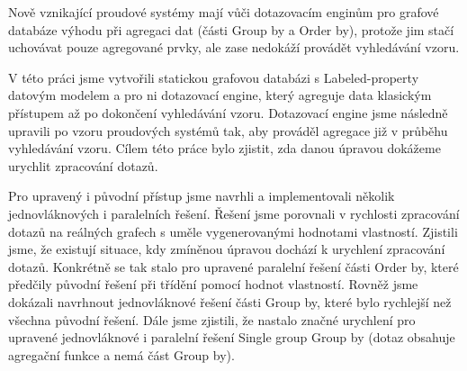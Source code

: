 \documentclass[12pt]{report}
\begin{document}
Nově vznikající proudové systémy mají vůči dotazovacím enginům pro grafové databáze výhodu při agregaci dat (části Group by a Order by), protože jim stačí uchovávat pouze agregované prvky, ale zase nedokáží provádět vyhledávání vzoru.

V této práci jsme vytvořili statickou grafovou databázi s Labeled-property datovým modelem a pro ni dotazovací engine, který agreguje data klasickým přístupem až po dokončení vyhledávání vzoru.
Dotazovací engine jsme následně upravili po vzoru proudových systémů tak, aby prováděl agregace již v průběhu vyhledávání vzoru.
Cílem této práce bylo zjistit, zda danou úpravou dokážeme urychlit zpracování dotazů.

Pro upravený i původní přístup jsme navrhli a implementovali několik jednovláknových i paralelních řešení.
Řešení jsme porovnali v rychlosti zpracování dotazů na reálných grafech s uměle vygenerovanými hodnotami vlastností.
Zjistili jsme, že existují situace, kdy zmíněnou úpravou dochází k urychlení zpracování dotazů.
Konkrétně se tak stalo pro upravené paralelní řešení části Order by, které předčily původní řešení při třídění pomocí hodnot vlastností.
Rovněž jsme dokázali navrhnout jednovláknové řešení části Group by, které bylo rychlejší než všechna původní řešení. 
Dále jsme zjistili, že nastalo značné urychlení pro upravené jednovláknové i paralelní řešení Single group Group by (dotaz obsahuje agregační funkce a nemá část Group by).
\end{document}
